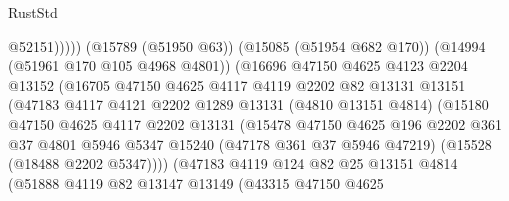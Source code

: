 \begin{lexlean}{RustStd}
\begin{coremodule}
                                      @52151)))))
                            (@15789 (@51950 @63))
                            (@15085 (@51954 @682 @170))
                            (@14994 (@51961 @170 @105 @4968 @4801))
                            (@16696
                              @47150
                              @4625
                              @4123
                              @2204
                              @13152
                              (@16705
                                @47150
                                @4625
                                @4117
                                @4119
                                @2202
                                @82
                                @13131
                                @13151
                                (@47183
                                  @4117
                                  @4121
                                  @2202
                                  @1289
                                  @13131
                                  (@4810 @13151 @4814)
                                  (@15180
                                    @47150
                                    @4625
                                    @4117
                                    @2202
                                    @13131
                                    (@15478
                                      @47150
                                      @4625
                                      @196
                                      @2202
                                      @361
                                      @37
                                      @4801
                                      @5946
                                      @5347
                                      @15240
                                      (@47178 @361 @37 @5946 @47219)
                                      (@15528 (@18488 @2202 @5347))))
                                  (@47183
                                    @4119
                                    @124
                                    @82
                                    @25
                                    @13151
                                    @4814
                                    (@51888
                                      @4119
                                      @82
                                      @13147
                                      @13149
                                      (@43315
                                        @47150
                                        @4625

\end{coremodule}
\end{lexlean}
